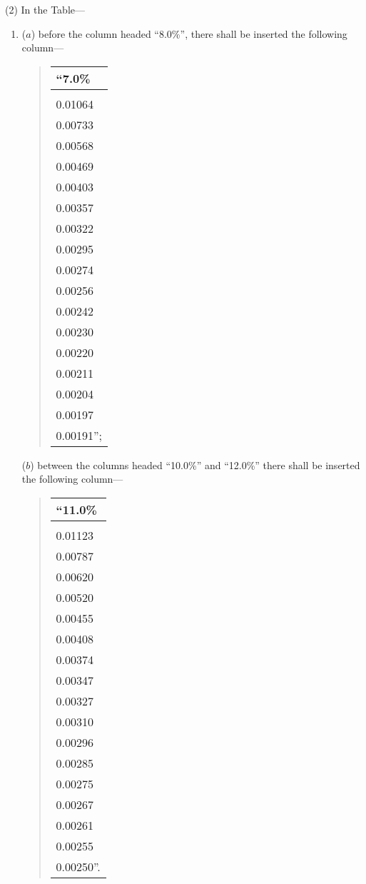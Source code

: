 \documentclass[12pt,a4paper]{article}
\begin{document}
(2) In the Table—
\begin{enumerate}\item[]
($a$) before the column headed “8.0\%”, there shall be inserted the following column—
\begin{quotation}\small
\noindent\begin{longtable}{l}
\hline
“7.0\%\\
\hline
\endhead
\hline
\endlastfoot
0.02058\\
0.01064\\
0.00733\\
0.00568\\
0.00469\\
0.00403\\
0.00357\\
0.00322\\
0.00295\\
0.00274\\
0.00256\\
0.00242\\
0.00230\\
0.00220\\
0.00211\\
0.00204\\
0.00197\\
0.00191”;\\
\end{longtable}
\end{quotation}

($b$) between the columns headed “10.0\%” and “12.0\%” there shall be inserted the following column—
\begin{quotation}\small
\noindent\begin{longtable}{l}
\hline
“11.0\%\\
\hline
\endhead
\hline
\endlastfoot
0.02135\\
0.01123\\
0.00787\\
0.00620\\
0.00520\\
0.00455\\
0.00408\\
0.00374\\
0.00347\\
0.00327\\
0.00310\\
0.00296\\
0.00285\\
0.00275\\
0.00267\\
0.00261\\
0.00255\\
0.00250”.\\
\end{longtable}
\end{quotation}
\end{enumerate}
\end{document}

